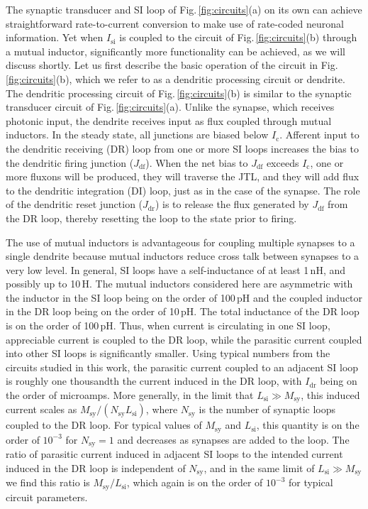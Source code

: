 \documentclass[twocolumn]{article}
\begin{document}
The synaptic transducer and SI loop of Fig.\,\ref{fig:circuits}(a) on its own can achieve straightforward rate-to-current conversion to make use of rate-coded neuronal information. Yet when $I_{\mathrm{si}}$ is coupled to the circuit of Fig.\,\ref{fig:circuits}(b) through a mutual inductor, significantly more functionality can be achieved, as we will discuss shortly. Let us first describe the basic operation of the circuit in Fig.\,\ref{fig:circuits}(b), which we refer to as a dendritic processing circuit or dendrite. The dendritic processing circuit of Fig.\,\ref{fig:circuits}(b) is similar to the synaptic transducer circuit of Fig.\,\ref{fig:circuits}(a). Unlike the synapse, which receives photonic input, the dendrite receives input as flux coupled through mutual inductors. In the steady state, all junctions are biased below $I_{\mathrm{c}}$. Afferent input to the dendritic receiving (DR) loop from one or more SI loops increases the bias to the dendritic firing junction ($J_{\mathrm{df}}$). When the net bias to $J_{\mathrm{df}}$ exceeds $I_{\mathrm{c}}$, one or more fluxons will be produced, they will traverse the JTL, and they will add flux to the dendritic integration (DI) loop, just as in the case of the synapse. The role of the dendritic reset junction ($J_{\mathrm{dr}}$) is to release the flux generated by $J_{\mathrm{df}}$ from the DR loop, thereby resetting the loop to the state prior to firing.

The use of mutual inductors is advantageous for coupling multiple synapses to a single dendrite because mutual inductors reduce cross talk between synapses to a very low level. In general, SI loops have a self-inductance of at least 1\,nH, and possibly up to 10\,\textmu H. The mutual inductors considered here are asymmetric with the inductor in the SI loop being on the order of 100\,pH and the coupled inductor in the DR loop being on the order of 10\,pH. The total inductance of the DR loop is on the order of 100\,pH. Thus, when current is circulating in one SI loop, appreciable current is coupled to the DR loop, while the parasitic current coupled into other SI loops is significantly smaller. Using typical numbers from the circuits studied in this work, the parasitic current coupled to an adjacent SI loop is roughly one thousandth the current induced in the DR loop, with $I_{\mathrm{dr}}$ being on the order of microamps. More generally, in the limit that $L_{\mathrm{si}} \gg M_{\mathrm{sy}}$, this induced current scales as $M_{\mathrm{sy}}/(N_{\mathrm{sy}}L_{\mathrm{si}})$, where $N_{\mathrm{sy}}$ is the number of synaptic loops coupled to the DR loop. For typical values of $M_{\mathrm{sy}}$ and $L_{\mathrm{si}}$, this quantity is on the order of $10^{-3}$ for $N_{\mathrm{sy}}=1$ and decreases as synapses are added to the loop. The ratio of parasitic current induced in adjacent SI loops to the intended current induced in the DR loop is independent of $N_{\mathrm{sy}}$, and in the same limit of $L_{\mathrm{si}} \gg M_{\mathrm{sy}}$ we find this ratio is $M_{\mathrm{sy}}/L_{\mathrm{si}}$, which again is on the order of $10^{-3}$ for typical circuit parameters.
\end{document}
